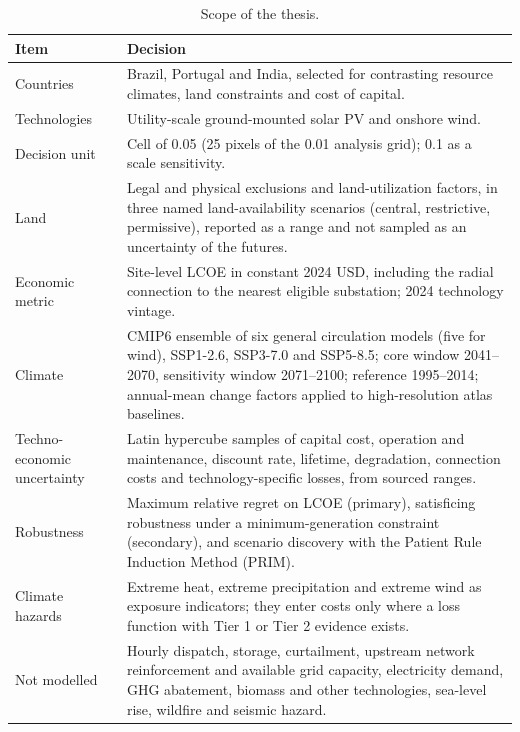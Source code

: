 \begin{table}[htbp]
\centering
\caption{Scope of the thesis.}
\label{tab:scope}
\small
\renewcommand{\arraystretch}{1.15}
\begin{tabularx}{\textwidth}{@{}>{\raggedright\arraybackslash}p{} >{\raggedright\arraybackslash}X@{}}
\toprule
\textbf{Item} & \textbf{Decision} \\
\midrule
Countries & Brazil, Portugal and India, selected for contrasting resource climates, land constraints and cost of capital. \\
Technologies & Utility-scale ground-mounted solar PV and onshore wind. \\
Decision unit & Cell of 0.05\textdegree{} (25 pixels of the 0.01\textdegree{} analysis grid); 0.1\textdegree{} as a scale sensitivity. \\
Land & Legal and physical exclusions and land-utilization factors, in three named land-availability scenarios (central, restrictive, permissive), reported as a range and not sampled as an uncertainty of the futures. \\
Economic metric & Site-level LCOE in constant 2024 USD, including the radial connection to the nearest eligible substation; 2024 technology vintage. \\
Climate & CMIP6 ensemble of six general circulation models (five for wind), SSP1-2.6, SSP3-7.0 and SSP5-8.5; core window 2041--2070, sensitivity window 2071--2100; reference 1995--2014; annual-mean change factors applied to high-resolution atlas baselines. \\
Techno-economic uncertainty & Latin hypercube samples of capital cost, operation and maintenance, discount rate, lifetime, degradation, connection costs and technology-specific losses, from sourced ranges. \\
Robustness & Maximum relative regret on LCOE (primary), satisficing robustness under a minimum-generation constraint (secondary), and scenario discovery with the Patient Rule Induction Method (PRIM). \\
Climate hazards & Extreme heat, extreme precipitation and extreme wind as exposure indicators; they enter costs only where a loss function with Tier 1 or Tier 2 evidence exists. \\
Not modelled & Hourly dispatch, storage, curtailment, upstream network reinforcement and available grid capacity, electricity demand, GHG abatement, biomass and other technologies, sea-level rise, wildfire and seismic hazard. \\
\bottomrule
\end{tabularx}
\end{table}

